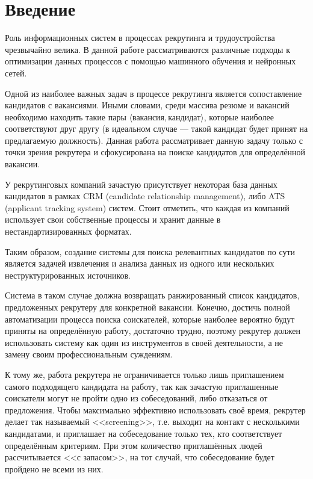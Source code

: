 \documentclass[14pt]{mmcs_article}
\begin{document}

\renewcommand{\contentsname}{Оглавление}

\tableofcontents

\newpage
{}
\section*{Введение}

Роль информационных систем в процессах рекрутинга и трудоустройства чрезвычайно велика.
В данной работе рассматриваются различные подходы к оптимизации данных процессов с помощью машинного обучения и нейронных сетей.

Одной из наиболее важных задач в процессе рекрутинга является сопоставление кандидатов с вакансиями. Иными словами, среди массива резюме и вакансий необходимо находить такие пары $\langle\text{вакансия},\text{кандидат}\rangle$, которые наиболее соответствуют друг другу (в идеальном случае --- такой кандидат будет принят на предлагаемую должность).
Данная работа рассматривает данную задачу только с точки зрения рекрутера и сфокусирована на поиске кандидатов для определённой вакансии.

У рекрутинговых компаний зачастую присутствует некоторая база данных кандидатов в рамках CRM (candidate relationship management), либо ATS (applicant tracking system) систем.
Стоит отметить, что каждая из компаний использует свои собственные процессы и хранит данные в нестандартизированных форматах.

Таким образом, создание системы для поиска релевантных кандидатов по сути является задачей извлечения и анализа данных из одного или нескольких неструктурированных источников.

Система в таком случае должна возвращать ранжированный список кандидатов, предложенных рекрутеру для конкретной вакансии. Конечно, достичь полной автоматизации процесса поиска соискателей, которые наиболее вероятно будут приняты на определённую работу, достаточно трудно, поэтому рекрутер должен использовать систему как один из инструментов в своей деятельности, а не замену своим профессиональным суждениям.

К тому же, работа рекрутера не ограничивается только лишь приглашением самого подходящего кандидата на работу, так как зачастую приглашенные соискатели могут не пройти одно из собеседований, либо отказаться от предложения. Чтобы максимально эффективно использовать своё время, рекрутер делает так называемый <<screening>>, т.е. выходит на контакт с несколькими кандидатами, и приглашает на собеседование только тех, кто соответствует определённым критериям. При этом количество приглашённых людей рассчитывается <<с запасом>>, на тот случай, что собеседование будет пройдено не всеми из них.
\end{document}
